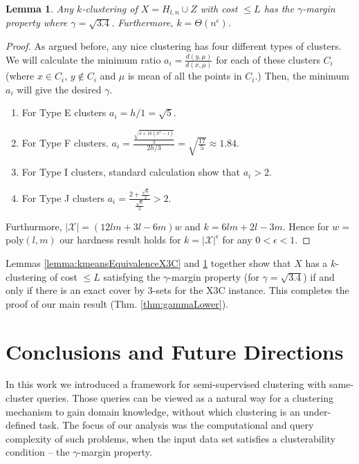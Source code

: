 \documentclass[12pt]{article}
\newcommand{\mc}{\mathcal}
\newtheorem{lemma}[theorem]{Lemma}
\begin{document}
\begin{lemma}
\label{lemma:gammaLower}
Any $k$-clustering of $X = H_{l,n} \cup Z$ with cost $\le L$ has the $\gamma$-margin property where $\gamma = \sqrt{3.4}$. Furthermore, $k = \Theta(n^{\epsilon})$.
\end{lemma}

\begin{proof}
As argued before, any nice clustering has four different types of clusters. We will calculate the minimum ratio $a_i = \frac{d(y, \mu)}{d(x, \mu)}$ for each of these clusters $C_i$ (where $x \in C_i$, $y \not\in C_i$ and $\mu$ is mean of all the points in $C_i$.) Then, the minimum $a_i$ will give the desired $\gamma$. 
\begin{enumerate}[label=(\arabic*),nolistsep,leftmargin=*]
\item For Type E clusters $a_i = h/1 = \sqrt{5}$. 
\item For Type F clusters. $a_i = \frac{\frac{\sqrt{4+16(h^2-1)}}{3}}{2h/3} = \sqrt{\frac{17}{5}} \approx 1.84$. 
\item For Type I clusters, standard calculation show that $a_i > 2$.
\item For Type J clusters $a_i = \frac{2+\frac{\sqrt{6}}{2}}{\frac{\sqrt{6}}{2}} > 2$.
\end{enumerate}

\noindent Furthurmore, $|\mc X| = (12lm + 3l -6m)w$ and $k = 6lm + 2l - 3m$. Hence for $w = $poly$(l, m)$ our hardness result holds for $k = |\mc X|^{\epsilon}$ for any $0 < \epsilon < 1$.
\end{proof}

\noindent Lemmas \ref{lemma:kmeansEquivalenceX3C} and \ref{lemma:gammaLower} together show that $X$ has a $k$-clustering of cost $\le L$ satisfying the $\gamma$-margin property (for $\gamma = \sqrt{3.4}$) if and only if there is an exact cover by $3$-sets for the X3C instance. This completes the proof of our main result (Thm. \ref{thm:gammaLower}). 

\section{Conclusions and Future Directions}
In this work we introduced a framework for semi-supervised clustering with same-cluster queries. Those queries can be viewed as a natural way for a clustering mechanism to gain domain knowledge, without which clustering is an under-defined task. The focus of our analysis was the computational and query complexity of %
such problems, when the input data set satisfies a clusterability condition -- the $\gamma$-margin property.
\end{document}
